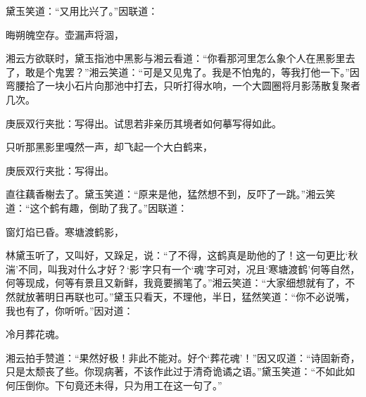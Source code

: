 \begin{parag}
    黛玉笑道：“又用比兴了。”因联道：
\end{parag}
\begin{poem}
    \begin{pl}
        晦朔魄空存。壶漏声将涸，
    \end{pl}
\end{poem}


\begin{parag}
    湘云方欲联时，黛玉指池中黑影与湘云看道：“你看那河里怎么象个人在黑影里去了，敢是个鬼罢？”湘云笑道：“可是又见鬼了。我是不怕鬼的，等我打他一下。”因弯腰拾了一块小石片向那池中打去，只听打得水响，一个大圆圈将月影荡散复聚者几次。\begin{note}庚辰双行夹批：写得出。试思若非亲历其境者如何摹写得如此。\end{note}只听那黑影里嘎然一声，却飞起一个大白鹤来，\begin{note}庚辰双行夹批：写得出。\end{note}直往藕香榭去了。黛玉笑道：“原来是他，猛然想不到，反吓了一跳。”湘云笑道：“这个鹤有趣，倒助了我了。”因联道：
\end{parag}
\begin{poem}
    \begin{pl}

        窗灯焰已昏。寒塘渡鹤影，

    \end{pl}
\end{poem}


\begin{parag}
    林黛玉听了，又叫好，又跺足，说：“了不得，这鹤真是助他的了！这一句更比‘秋湍’不同，叫我对什么才好？‘影’字只有一个‘魂’字可对，况且‘寒塘渡鹤’何等自然，何等现成，何等有景且又新鲜，我竟要搁笔了。”湘云笑道：“大家细想就有了，不然就放著明日再联也可。”黛玉只看天，不理他，半日，猛然笑道：“你不必说嘴，我也有了，你听听。”因对道：
\end{parag}


\begin{poem}
    \begin{pl}
        冷月葬花魂。
    \end{pl}
\end{poem}


\begin{parag}
    湘云拍手赞道：“果然好极！非此不能对。好个‘葬花魂’！”因又叹道：“诗固新奇，只是太颓丧了些。你现病著，不该作此过于清奇诡谲之语。”黛玉笑道：“不如此如何压倒你。下句竟还未得，只为用工在这一句了。”
\end{parag}


